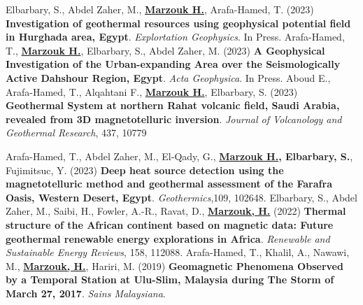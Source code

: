 

\begin{scholarship}
	\emptySeparator


	{Elbarbary, S., Abdel Zaher, M., \textbf{\underline{Marzouk H.}}, Arafa-Hamed, T. (2023)  \textbf{Investigation of geothermal resources using geophysical potential field in Hurghada area, Egypt}. \textit{Explortation Geophysics}. In Press.\newline}
	{Arafa-Hamed, T., \textbf{\underline{Marzouk H.}}, Elbarbary, S.,  Abdel Zaher, M. (2023)  \textbf{A Geophysical Investigation of the Urban-expanding Area over the Seismologically Active Dahshour Region, Egypt}. \textit{Acta Geophysica}. In Press.\newline}
	{ Aboud E., Arafa-Hamed, T., Alqahtani F., \textbf{\underline{Marzouk H.}}, Elbarbary, S. (2023)  \textbf{Geothermal System at northern Rahat volcanic field, Saudi Arabia, revealed from 3D magnetotelluric inversion}. \textit{Journal of Volcanology and Geothermal Research}, 437, 10779 \newline
		\newline}

	{Arafa-Hamed, T., Abdel Zaher, M., El-Qady, G., \textbf{\underline{Marzouk H.}, Elbarbary, S.}, Fujimitsuc, Y. (2023)  \textbf{Deep heat source detection using the magnetotelluric method and geothermal assessment of the Farafra Oasis, Western Desert, Egypt}. \textit{Geothermics},109, 102648. \newline
		\newline   }
	{
		Elbarbary, S., Abdel Zaher, M., Saibi, H., Fowler, A.-R., Ravat, D., \textbf{\underline{Marzouk, H.}} (2022) \textbf{Thermal structure of the African continent based on magnetic data: Future geothermal renewable energy explorations in Africa}. \textit{Renewable and Sustainable Energy Reviews}, 158, 112088.  \newline
		\newline  }
	{
		Arafa-Hamed, T., Khalil, A., Nawawi, M., \textbf{\underline{Marzouk, H.}}, Hariri, M. (2019) \textbf{Geomagnetic Phenomena Observed by a Temporal Station at Ulu-Slim, Malaysia during The Storm of March 27, 2017}. \textit{Sains Malaysiana}.  \newline
		\newline  }


\end{scholarship}
